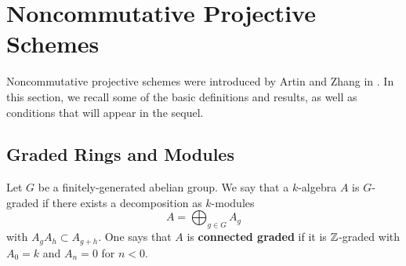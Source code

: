 \chapter{Noncommutative Projective Schemes}\label{chapter: background on NCP}

Noncommutative projective schemes were introduced by Artin and Zhang in \parencite{AZ94}.
In this section, we recall some of the basic definitions and results, as well as conditions that will appear in the sequel.

\section{Graded Rings and Modules}
\begin{definition}
  Let \(G\) be a finitely-generated abelian group. We say that a \(k\)-algebra \(A\) is \(G\)-graded if there exists a decomposition as \(k\)-modules 
  \begin{displaymath}
    A = \bigoplus_{g \in G} A_g
  \end{displaymath}
  with \(A_g A_h \subset A_{g+h}\). One says that \(A\) is \textbf{connected graded} if it is \(\mathbb{Z}\)-graded with \(A_0 = k\) and \(A_n = 0\) for \(n < 0\). 
\end{definition}





